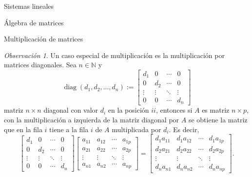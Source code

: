 \documentclass[a4paper,12pt,twoside,spanish,reqno]{amsbook}
\numberwithin{equation}{section}
\theoremstyle{definition}
\theoremstyle{remark}
\newtheorem{observacion}[teorema]{Observaci\'on}
\begin{document}
\begin{chapter}{Sistemas lineales}
\begin{section}{Álgebra de matrices}
\begin{subsection}{Multiplicación de matrices}
                \begin{observacion}\label{obs-mult-matrices-diagonales}
                    Un  caso especial de multiplicación es la multiplicación por matrices diagonales. Sea $n \in \mathbb N$ y 
                \begin{equation*}
                    \operatorname{diag}(d_1,d_2,\ldots,d_n) := \begin{bmatrix}
                    d_1 & 0 & \cdots &0 \\
                    0 & d_2 & \cdots &0 \\
                    \vdots & \vdots & \ddots &\vdots \\
                    0 & 0 & \cdots & d_n 
                    \end{bmatrix}
                \end{equation*}
                matriz $n \times n$ diagonal con valor $d_i$  en la posición $ii$,  entonces si $A$ es matriz $n \times p$,  con la multiplicación a izquierda de la matriz diagonal por $A$  se obtiene la matriz que en la fila $i$ tiene a la fila $i$ de $A$ multiplicada por $d_i$.  Es decir,
                \begin{equation*}
                \begin{bmatrix}
                d_1 & 0 & \cdots &0 \\
                0 & d_2 & \cdots &0 \\
                \vdots & \vdots & \ddots &\vdots \\
                0 & 0 & \cdots & d_n 
                \end{bmatrix}
                \begin{bmatrix}
                a_{11} & a_{12} & \cdots &a_{1p} \\
                a_{21} & a_{22} & \cdots &a_{2p}\\
                \vdots & \vdots & \ddots &\vdots \\
                a_{n1} & a_{n2} & \cdots & a_{np} 
                \end{bmatrix}
                =
                \begin{bmatrix}
                d_1a_{11} & d_1a_{12} & \cdots &d_1a_{1p} \\
                d_2a_{21} & d_2a_{22} & \cdots &d_2a_{2p}\\
                \vdots & \vdots & \ddots &\vdots \\
                d_n a_{n1} & d_n a_{n2} & \cdots & d_n a_{np} 
                \end{bmatrix}.

\end{equation*}
\end{observacion}
\end{subsection}
\end{section}
\end{chapter}
\end{document}
